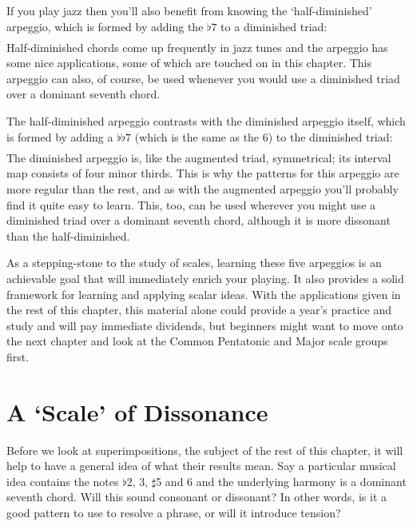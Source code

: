 \documentclass[english]{./gbook}
\begin{document}
\begin{large}
If you play jazz then you'll also benefit from knowing the `half-diminished' arpeggio, which is formed by adding the $\flat 7$ to a diminished triad:
\[
\begin{array}{ccccc}
	&%
	&%
	&%
	&%
\end{array}
\]
Half-diminished chords come up frequently in jazz tunes and the arpeggio has some nice applications, some of which are touched on in this chapter. This arpeggio can also, of course, be used whenever you would use a diminished triad over a dominant seventh chord.

The half-diminished arpeggio contrasts with the diminished arpeggio itself, which is formed by adding a $\flat\flat 7$ (which is the same as the 6) to the diminished triad:
\[
\begin{array}{ccccc}
	&%
	&%
	&%
	&%
\end{array}
\]
The diminished arpeggio is, like the augmented triad, symmetrical; its interval map consists of four minor thirds. This is why the patterns for this arpeggio are more regular than the rest, and as with the augmented arpeggio you'll probably find it quite easy to learn. This, too, can be used wherever you might use a diminished triad over a dominant seventh chord, although it is more dissonant than the half-diminished.

As a stepping-stone to the study of scales, learning these five arpeggios is an achievable goal that will immediately enrich your playing. It also provides a solid framework for learning and applying scalar ideas. With the applications given in the rest of this chapter, this material alone could provide a year's practice and study and will pay immediate dividends, but beginners might want to move onto the next chapter and look at the Common Pentatonic and Major scale groups first.

\section{A `Scale' of Dissonance}

Before we look at superimpositions, the subject of the rest of this chapter, it will help to have a general idea of what their results mean. Say a particular musical idea contains the notes $\flat$2, 3, $\sharp$5 and 6 and the underlying harmony is a dominant seventh chord. Will this sound consonant or dissonant? In other words, is it a good pattern to use to resolve a phrase, or will it introduce tension?


\end{large}
\end{document}
